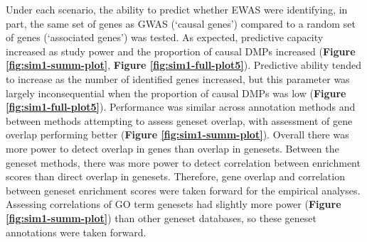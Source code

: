 \documentclass[11pt,twoside]{bristolthesis}
\begin{document}
Under each scenario, the ability to predict whether EWAS were identifying, in part, the same set of genes as GWAS (`causal genes') compared to a random set of genes (`associated genes') was tested. As expected, predictive capacity increased as study power and the proportion of causal DMPs increased (\textbf{Figure \ref{fig:sim1-summ-plot}}, \textbf{Figure \ref{fig:sim1-full-plot5}}). Predictive ability tended to increase as the number of identified genes increased, but this parameter was largely inconsequential when the proportion of causal DMPs was low (\textbf{Figure \ref{fig:sim1-full-plot5}}). Performance was similar across annotation methods and between methods attempting to assess geneset overlap, with assessment of gene overlap performing better (\textbf{Figure \ref{fig:sim1-summ-plot}}). Overall there was more power to detect overlap in genes than overlap in genesets. Between the geneset methods, there was more power to detect correlation between enrichment scores than direct overlap in genesets. Therefore, gene overlap and correlation between geneset enrichment scores were taken forward for the empirical analyses. Assessing correlations of GO term genesets had slightly more power (\textbf{Figure \ref{fig:sim1-summ-plot}}) than other geneset databases, so these geneset annotations were taken forward.
\end{document}
